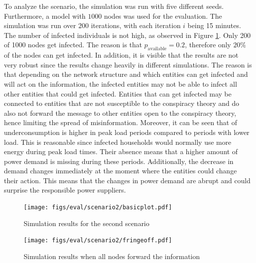 To analyze the scenario, the simulation was run with five 
different seeds. Furthermore, a model with $1000$ nodes was used 
for the evaluation. 
The simulation was run over $200$ iterations, with each
iteration $i$ being 15 minutes.
The number of infected individuals 
is not high, as observed in Figure \ref{schwurblerresults}.
Only 200 of 1000 nodes get infected. The reason is 
that $p_{\mathrm{available}}=0.2$, therefore only $20\%$ of the nodes
can get infected. In addition, it is visible that the results 
are not very robust since the results change heavily in different 
simulations. The reason is that depending on the network structure
and which entities can get infected and will act on the information, 
the infected entities may not be able to infect all other entities
that could get infected. Entities that can get infected may be 
connected to entities that are not susceptible to the conspiracy 
theory and do also not forward the message to other entities
open to the conspiracy theory, hence limiting the 
spread of misinformation.
Moreover, it can be seen that of underconsumption
is higher in peak load periods compared to periods with 
lower load. This is reasonable since infected households would 
normally use more energy during peak load times. Their absence
means that a higher amount of power demand is missing 
during these periods. Additionally, the decrease in demand 
changes immediately at the moment where the entities 
could change their action. This means that the changes 
in power demand are abrupt and could surprise the responsible 
power suppliers.

\begin{figure}[!ht]
    \center
    \texttt{[image: figs/eval/scenario2/basicplot.pdf]}
    \caption{Simulation results for the second scenario}
    \label{schwurblerresults}
\end{figure}

\begin{figure}[!ht]
    \center
    \texttt{[image: figs/eval/scenario2/fringeoff.pdf]}
    \caption{Simulation results when all nodes forward the information}
    \label{schwurblerresults2}
\end{figure}

